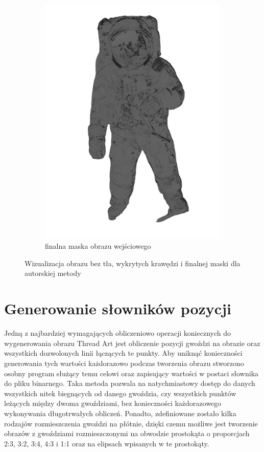\begin{figure}[H]
\begin{subfigure}{0.40\textwidth}
            \includegraphics[width = \textwidth]{img/4-mine/input-mask.png}
            \caption{finalna maska obrazu wejściowego}
            \label{mine-input-2-c}
        \end{subfigure}
        \caption{Wizualizacja obrazu bez tła, wykrytych krawędzi i finalnej maski dla autorskiej metody}
        \label{mine-input-2}
        \end{figure}
    
    \section{Generowanie słowników pozycji} \label{mine-dict}
    Jedną z najbardziej wymagających obliczeniowo operacji koniecznych do wygenerowania obrazu Thread Art jest obliczenie pozycji gwoździ na obrazie oraz wszystkich dozwolonych linii łączących te punkty. Aby uniknąć konieczności generowania tych wartości każdorazowo podczas tworzenia obrazu stworzono osobny program służący temu celowi oraz zapisujący wartości w postaci słownika do pliku binarnego. Taka metoda pozwala na natychmiastowy dostęp do danych wszystkich nitek biegnących od danego gwoździa, czy wszystkich punktów leżących między dwoma gwoździami, bez konieczności każdorazowego wykonywania długotrwałych obliczeń. Ponadto, zdefiniowane zostało kilka rodzajów rozmieszczenia gwoździ na płótnie, dzięki czemu możliwe jest tworzenie obrazów z gwoździami rozmieszczonymi na obwodzie prostokąta o proporcjach 2:3, 3:2, 3:4, 4:3 i 1:1 oraz na elipsach wpisanych w te prostokąty. 
    
